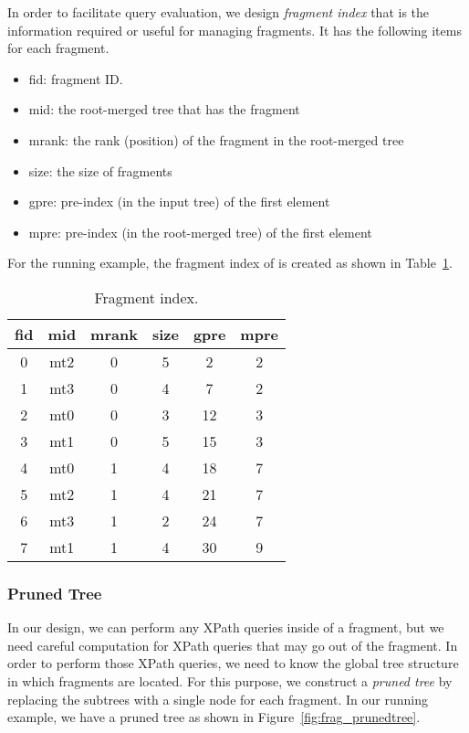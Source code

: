 In order to facilitate query evaluation, we design \emph{fragment index} that 
is the information required or useful for managing fragments.  
It has the following items for each fragment.

\begin{itemize}
	\item fid: fragment ID.
	\item mid: the root-merged tree that has the fragment
	\item mrank: the rank (position) of the fragment in the root-merged tree
	\item size: the size of fragments
	\item gpre: pre-index (in the input tree) of the first element
	\item mpre: pre-index (in the root-merged tree) of the first element
\end{itemize}

For the running example, the fragment index of is created as shown in Table~\ref{tab:fragmentindex}. 

\begin{table}[t]
	\centering 
	\begin{tabular}{c|c|c|c|c|c}
		\hline
		fid & mid & mrank & size & gpre & mpre \\
		\hline
		0   & mt2 & 0     &   5  & 2    & 2    \\
		1   & mt3 & 0     &   4  & 7    & 2    \\
		2   & mt0 & 0     &   3  & 12   & 3    \\
		3   & mt1 & 0     &   5  & 15   & 3    \\
		4   & mt0 & 1     &   4  & 18   & 7    \\
		5   & mt2 & 1     &   4  & 21   & 7    \\
		6   & mt3 & 1     &   2  & 24   & 7    \\
		7   & mt1 & 1     &   4  & 30   & 9    \\
		\hline
	\end{tabular} 
	\caption{Fragment index.}
	\label{tab:fragmentindex}	
\end{table}

\subsubsection{Pruned Tree}

In our design, we can perform any XPath queries inside of a fragment, 
but we need careful computation for XPath queries that may go out of the 
fragment. In order to perform those XPath queries, we need to know the 
global tree structure in which fragments are located.
For this purpose, we construct a \emph{pruned tree} by replacing the 
subtrees with a single node for each fragment.
In our running example, we have a pruned tree as shown in Figure~\ref{fig:frag_prunedtree}. 

